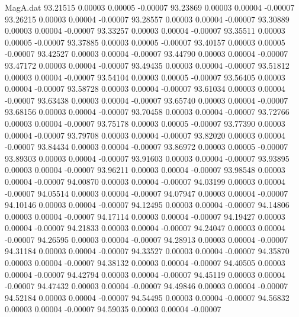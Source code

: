 \begin{filecontents}{MagA.dat}
  93.21515    0.00003    0.00005   -0.00007
  93.23869    0.00003    0.00004   -0.00007
  93.26215    0.00003    0.00004   -0.00007
  93.28557    0.00003    0.00004   -0.00007
  93.30889    0.00003    0.00004   -0.00007
  93.33257    0.00003    0.00004   -0.00007
  93.35511    0.00003    0.00005   -0.00007
  93.37885    0.00003    0.00005   -0.00007
  93.40157    0.00003    0.00005   -0.00007
  93.42527    0.00003    0.00004   -0.00007
  93.44790    0.00003    0.00004   -0.00007
  93.47172    0.00003    0.00004   -0.00007
  93.49435    0.00003    0.00004   -0.00007
  93.51812    0.00003    0.00004   -0.00007
  93.54104    0.00003    0.00005   -0.00007
  93.56405    0.00003    0.00004   -0.00007
  93.58728    0.00003    0.00004   -0.00007
  93.61034    0.00003    0.00004   -0.00007
  93.63438    0.00003    0.00004   -0.00007
  93.65740    0.00003    0.00004   -0.00007
  93.68156    0.00003    0.00004   -0.00007
  93.70458    0.00003    0.00004   -0.00007
  93.72766    0.00003    0.00004   -0.00007
  93.75178    0.00003    0.00005   -0.00007
  93.77390    0.00003    0.00004   -0.00007
  93.79708    0.00003    0.00004   -0.00007
  93.82020    0.00003    0.00004   -0.00007
  93.84434    0.00003    0.00004   -0.00007
  93.86972    0.00003    0.00005   -0.00007
  93.89303    0.00003    0.00004   -0.00007
  93.91603    0.00003    0.00004   -0.00007
  93.93895    0.00003    0.00004   -0.00007
  93.96211    0.00003    0.00004   -0.00007
  93.98548    0.00003    0.00004   -0.00007
  94.00870    0.00003    0.00004   -0.00007
  94.03199    0.00003    0.00004   -0.00007
  94.05514    0.00003    0.00004   -0.00007
  94.07947    0.00003    0.00004   -0.00007
  94.10146    0.00003    0.00004   -0.00007
  94.12495    0.00003    0.00004   -0.00007
  94.14806    0.00003    0.00004   -0.00007
  94.17114    0.00003    0.00004   -0.00007
  94.19427    0.00003    0.00004   -0.00007
  94.21833    0.00003    0.00004   -0.00007
  94.24047    0.00003    0.00004   -0.00007
  94.26595    0.00003    0.00004   -0.00007
  94.28913    0.00003    0.00004   -0.00007
  94.31184    0.00003    0.00004   -0.00007
  94.33527    0.00003    0.00004   -0.00007
  94.35870    0.00003    0.00004   -0.00007
  94.38132    0.00003    0.00004   -0.00007
  94.40505    0.00003    0.00004   -0.00007
  94.42794    0.00003    0.00004   -0.00007
  94.45119    0.00003    0.00004   -0.00007
  94.47432    0.00003    0.00004   -0.00007
  94.49846    0.00003    0.00004   -0.00007
  94.52184    0.00003    0.00004   -0.00007
  94.54495    0.00003    0.00004   -0.00007
  94.56832    0.00003    0.00004   -0.00007
  94.59035    0.00003    0.00004   -0.00007

\end{filecontents}
